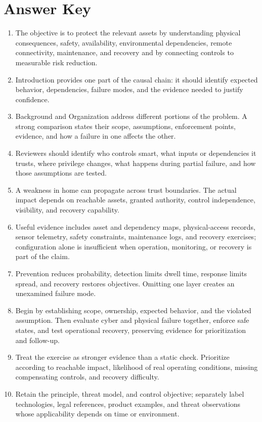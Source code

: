 \documentclass[11pt,letterpaper]{article}
\begin{document}
\section*{Answer Key}
\begin{enumerate}
\item The objective is to protect the relevant assets by understanding physical consequences, safety, availability, environmental dependencies, remote connectivity, maintenance, and recovery and by connecting controls to measurable risk reduction.
\item Introduction provides one part of the causal chain: it should identify expected behavior, dependencies, failure modes, and the evidence needed to justify confidence.
\item Background and Organization address different portions of the problem. A strong comparison states their scope, assumptions, enforcement points, evidence, and how a failure in one affects the other.
\item Reviewers should identify who controls smart, what inputs or dependencies it trusts, where privilege changes, what happens during partial failure, and how those assumptions are tested.
\item A weakness in home can propagate across trust boundaries. The actual impact depends on reachable assets, granted authority, control independence, visibility, and recovery capability.
\item Useful evidence includes asset and dependency maps, physical-access records, sensor telemetry, safety constraints, maintenance logs, and recovery exercises; configuration alone is insufficient when operation, monitoring, or recovery is part of the claim.
\item Prevention reduces probability, detection limits dwell time, response limits spread, and recovery restores objectives. Omitting one layer creates an unexamined failure mode.
\item Begin by establishing scope, ownership, expected behavior, and the violated assumption. Then evaluate cyber and physical failure together, enforce safe states, and test operational recovery, preserving evidence for prioritization and follow-up.
\item Treat the exercise as stronger evidence than a static check. Prioritize according to reachable impact, likelihood of real operating conditions, missing compensating controls, and recovery difficulty.
\item Retain the principle, threat model, and control objective; separately label technologies, legal references, product examples, and threat observations whose applicability depends on time or environment.
\end{enumerate}
\end{document}
